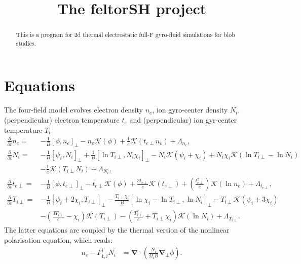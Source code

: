 \documentclass{hitec} %
\renewcommand{\vec}[1]{\boldsymbol{#1}}
\begin{document}
\title{The feltorSH project}
\maketitle

\begin{abstract}
This is a program for 2d thermal electrostatic full-F gyro-fluid simulations for blob studies.
\end{abstract}

\section{Equations}
The four-field model evolves electron density 
\(n_e\), ion gyro-center density \(N_i\), (perpendicular) electron temperature \(t_e\) and (perpendicular) ion gyr-center temperature \(T_i\)
\begin{align}
\frac{\partial}{\partial t} n_e =&-
\frac{1}{B} \left[\phi,n_e \right]_{\perp} - n_e \mathcal{K}\left(\phi \right) + \frac{1}{e} \mathcal{K}\left(t_{e\perp} n_e \right) 
+  \Lambda_{n_e},  \\
\frac{\partial}{\partial t} N_i =&
-\frac{1}{B} \left[\psi_i ,N_i \right]_{\perp} 
+\frac{1}{B} \left[\ln T_{i\perp},N_i \chi_i \right]_{\perp}
- N_i \mathcal{K}\left(\psi_i + \chi_i\right) 
+ N_i \chi_i \mathcal{K}\left(\ln T_{i\perp} -  \ln N_i \right) \\ \nonumber
&
- \frac{1}{e} \mathcal{K}\left(T_{i\perp} N_i \right) 
+  \Lambda_{N_i} , \\
   \frac{\partial }{\partial t}  t_{e\perp} =&
   -\frac{1}{B} \left[ \phi , t_{e\perp} \right]_{\perp}  
 -t_{e\perp}   \mathcal{K} (\phi )  
+ \frac{3 t_{e\perp}}{ e }   \mathcal{K} (t_{e\perp})
+  \left(\frac{t_{e\perp}^2}{e}  \right)\mathcal{K} \left(  \ln  n_e  \right) 
 + \Lambda_{t_{e\perp} },  \\
    \frac{\partial }{\partial t}  T_{i\perp} =&
-\frac{1}{B} \left[ \psi_i + 2\chi_i ,T_{i\perp} \right]_{\perp}  
 - \frac{T_{i\perp} \chi_i}{B } \left[\ln  \chi_i - \ln T_{i\perp} , \ln N_i\right]_{\perp}
 -T_{i\perp}  \mathcal{K} (\psi_i + 3\chi_i)  \\ \nonumber
&
- \left(\frac{3 T_{i\perp} }{e}  - \chi_i \right)\mathcal{K} (T_{i\perp} ) 
-  \left(\frac{T_{i\perp} ^2}{e} + T_{i\perp}   \chi_i \right)\mathcal{K} \left(  \ln  N_i  \right) 
 + \Lambda_{T_{i\perp} }.
\end{align}
The latter equations are coupled by the thermal version of the nonlinear polarisation equation, which reads:
\begin{align}
  n_e -\Gamma_{1,i}^\dagger N_i &= \vec{\nabla} \cdot\left(\frac{N_i}{\Omega_i B} \vec{\nabla}_\perp \phi\right).
\end{align}
\end{document}
